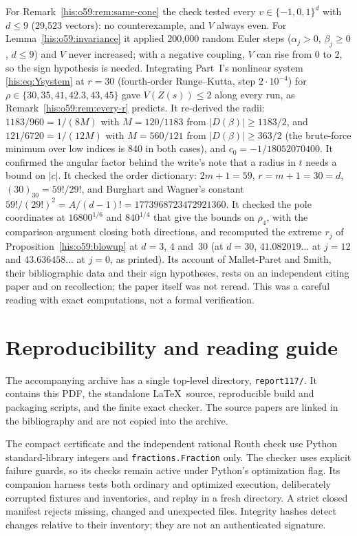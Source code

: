 \documentclass[11pt]{article}
\theoremstyle{remark}\newtheorem{remark}[theorem]{Remark}
\numberwithin{equation}{section}
\begin{document}
For Remark~\ref{his:o59:rem:same-cone} the check tested every
$v\in\{-1,0,1\}^d$ with $d\le9$ (29{,}523 vectors): no counterexample, and
$V$ always even. For Lemma~\ref{his:o59:invariance} it applied 200{,}000
random Euler steps ($\alpha_j>0$, $\beta_j\ge0$, $d\le9$) and $V$ never
increased; with a negative coupling, $V$ can rise from $0$ to $2$, so the
sign hypothesis is needed. Integrating Part~I's nonlinear system
\eqref{his:eq:Ysystem} at $r=30$ (fourth-order Runge--Kutta, step
$2\cdot10^{-4}$) for $\rho\in\{30,35,41,42.3,43,45\}$ gave $V(Z(s))\le2$
along every run, as Remark~\ref{his:o59:rem:every-r} predicts. It
re-derived the radii: $1183/960=1/(8M)$ with $M=120/1183$ from
$|D(\beta)|\ge1183/2$, and $121/6720=1/(12M)$ with $M=560/121$ from
$|D(\beta)|\ge363/2$ (the brute-force minimum over low indices is $840$ in
both cases), and $c_0=-1/18052070400$. It confirmed the angular factor
behind the write's note that a radius in $t$ needs a bound on $|c|$. It
checked the order dictionary: $2m+1=59$, $r=m+1=30=d$, $(30)_{30}=59!/29!$,
and Burghart and Wagner's constant $59!/(29!)^2=A/(d-1)!
=1773968723472921360$. It checked the pole coordinates at
$16800^{1/6}$ and $840^{1/4}$ that give the bounds on $\rho_4$, with the
comparison argument closing both directions, and recomputed the extreme
$r_j$ of Proposition~\ref{his:o59:blowup} at $d=3$, $4$ and~$30$ (at $d=30$,
$41.082019\ldots$ at $j=12$ and $43.636458\ldots$ at $j=0$, as printed).
Its account of Mallet-Paret and Smith, their bibliographic data and their
sign hypotheses, rests on an independent citing paper and on recollection;
the paper itself was not reread. This was a
careful reading with exact computations, not a formal verification.

\section{Reproducibility and reading guide}\label{his:o59:sec:repro}
The accompanying archive has a single top-level directory,
\texttt{report117/}. It contains this PDF, the standalone \LaTeX\ source,
reproducible build and packaging scripts, and the finite exact checker.
The source papers are linked in the bibliography and are not copied
into the archive.

The compact certificate and the independent rational Routh check use
Python standard-library integers and \texttt{fractions.Fraction} only.
The checker uses explicit failure guards, so its checks remain active
under Python's optimization flag. Its companion harness tests both
ordinary and optimized execution, deliberately corrupted fixtures and
inventories, and replay in a fresh directory. A strict closed manifest
rejects missing, changed and unexpected files. Integrity hashes detect
changes relative to their inventory; they are not an authenticated
signature.
\end{document}
